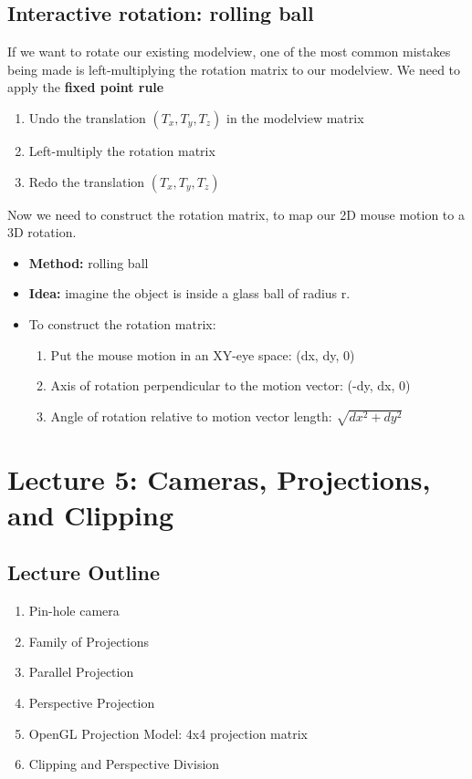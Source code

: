 \documentclass[11pt]{article}
\begin{document}
\subsection{Interactive rotation: rolling ball}
If we want to rotate our existing modelview, one of the most common mistakes being made is left-multiplying the rotation matrix to our modelview. We need to apply the \textbf{fixed point rule}
\begin{enumerate}
    \item Undo the translation $(T_x, T_y, T_z)$ in the modelview matrix
    \item Left-multiply the rotation matrix
    \item Redo the translation $(T_x, T_y, T_z)$ 
\end{enumerate}
\noindent
Now we need to construct the rotation matrix, to map our 2D mouse motion to a 3D rotation.
\begin{itemize}
    \item \textbf{Method:}  rolling ball
    \item \textbf{Idea:} imagine the object is inside a glass ball of radius r.
    \item To construct the rotation matrix: \begin{enumerate}
        \item Put the mouse motion in an XY-eye space: (dx, dy, 0)
        \item Axis of rotation perpendicular to the motion vector: (-dy, dx, 0)
        \item Angle of rotation relative to motion vector length: $\sqrt{dx^2 + dy^2}$ 
    \end{enumerate}

    
\end{itemize}

\section{Lecture 5: Cameras, Projections, and Clipping}
\subsection*{Lecture Outline}
\begin{enumerate}
    \item Pin-hole camera
    \item Family of Projections
    \item Parallel Projection
    \item Perspective Projection
    \item OpenGL Projection Model: 4x4 projection matrix
    \item Clipping and Perspective Division
\end{enumerate}
\end{document}
